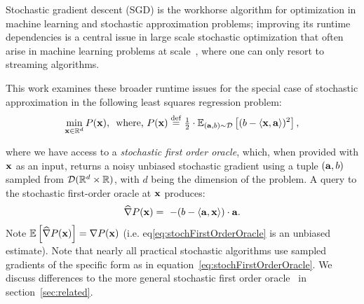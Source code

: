 
Stochastic gradient descent (SGD) is the workhorse algorithm for
optimization in machine learning and stochastic approximation
problems; improving its runtime dependencies is a central issue in
large scale stochastic optimization that often arise in machine 
learning problems at scale~\citep{BottouB07}, where one can only resort to streaming algorithms. 


This work examines these broader runtime issues for the special case of stochastic approximation in the
following least squares regression problem:%
\vspace{-0.2cm}
\begin{align}
\label{eq:objFun}
\min_{\mathbf{x} \in \mathbb{R}^d} P(\mathbf{x}), \, \, \, 
\text{where, }P(\mathbf{x})\stackrel{\mathrm{def}}{=} \tfrac{1}{2} \cdot\mathbb{E}_{(\mathbf{a},b)\sim \mathcal{D}}\left[(b-\left\langle \mathbf{x}, \mathbf{a} \right\rangle)^2\right],
\end{align}

\vspace{-0.3cm}
\noindent where we have access to a {\em stochastic first order oracle}, which, when provided with $\mathbf{x}$ as an input, returns a noisy unbiased stochastic gradient using a tuple $(\mathbf{a},b)$ sampled from $\mathcal{D}(\mathbb{R}^d\times \mathbb{R})$, with $d$ being the dimension of the problem. A query to the stochastic first-order oracle at $\mathbf{x}$ produces: %
\vspace{-0.25cm}
\begin{align}
\label{eq:stochFirstOrderOracle}
\widehat{\nabla}P(\x) = \ -(b-\iprod{\a}{\x})\cdot\a.%
\end{align}
Note $\mathbb{E}\left[\widehat{\nabla}P(\mathbf{x})\right]=\nabla P(\mathbf{x})$ (i.e. eq\eqref{eq:stochFirstOrderOracle} is an unbiased estimate). Note that nearly all practical stochastic algorithms use sampled gradients of the specific form as in equation~\ref{eq:stochFirstOrderOracle}. We discuss differences to the more general stochastic first order oracle~\citep{NemirovskyY83} in section~\ref{sec:related}.

